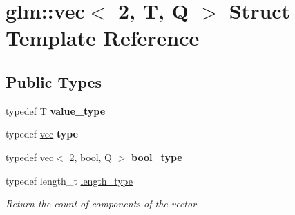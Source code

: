 \hypertarget{structglm_1_1vec_3_012_00_01T_00_01Q_01_4}{}\section{glm\+:\+:vec$<$ 2, T, Q $>$ Struct Template Reference}
\label{structglm_1_1vec_3_012_00_01T_00_01Q_01_4}
\subsection*{Public Types}
\begin{DoxyCompactItemize}
\item 
\mbox{\label{structglm_1_1vec_3_012_00_01T_00_01Q_01_4_ab44999b08d6a5e2c26e7708ada237759}} 
typedef T {\bfseries value\+\_\+type}
\item 
\mbox{\label{structglm_1_1vec_3_012_00_01T_00_01Q_01_4_a2734b4716ffba77d4ce4cc866cb31d3f}} 
typedef \hyperlink{structglm_1_1vec}{vec} {\bfseries type}
\item 
\mbox{\label{structglm_1_1vec_3_012_00_01T_00_01Q_01_4_a69145b83aafbff09d5d187089564c46f}} 
typedef \hyperlink{structglm_1_1vec}{vec}$<$ 2, bool, Q $>$ {\bfseries bool\+\_\+type}
\item 
\mbox{\label{structglm_1_1vec_3_012_00_01T_00_01Q_01_4_af8b652526ec88c8513b2a8c05bf92441}} 
typedef length\+\_\+t \hyperlink{structglm_1_1vec_3_012_00_01T_00_01Q_01_4_af8b652526ec88c8513b2a8c05bf92441}{length\+\_\+type}
\begin{DoxyCompactList}\small\item\em Return the count of components of the vector. \end{DoxyCompactList}\end{DoxyCompactItemize}
